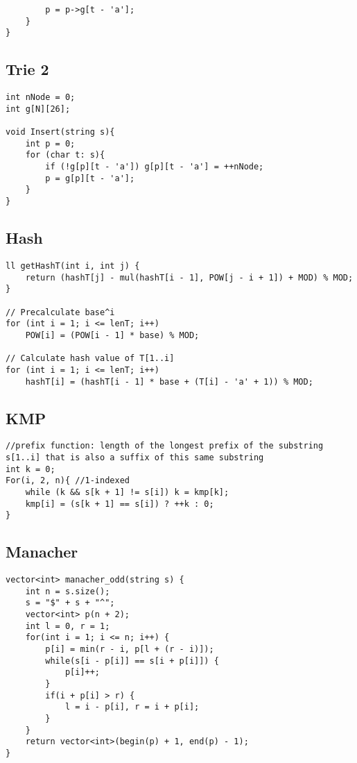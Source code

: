 \documentclass[11pt,a4paper]{article}
\begin{document}
\begin{multicols*}{2}
\begin{lstlisting}
		p = p->g[t - 'a'];	
	}
}
\end{lstlisting}

\subsection{Trie 2}
\begin{lstlisting}
int nNode = 0;
int g[N][26];

void Insert(string s){
    int p = 0;
    for (char t: s){
        if (!g[p][t - 'a']) g[p][t - 'a'] = ++nNode;
        p = g[p][t - 'a'];
    }
}
\end{lstlisting}

\subsection{Hash}
\begin{lstlisting}
ll getHashT(int i, int j) {
    return (hashT[j] - mul(hashT[i - 1], POW[j - i + 1]) + MOD) % MOD;
}

// Precalculate base^i
for (int i = 1; i <= lenT; i++)
    POW[i] = (POW[i - 1] * base) % MOD;

// Calculate hash value of T[1..i]
for (int i = 1; i <= lenT; i++)
    hashT[i] = (hashT[i - 1] * base + (T[i] - 'a' + 1)) % MOD;
\end{lstlisting}

\subsection{KMP}
\begin{lstlisting}
//prefix function: length of the longest prefix of the substring s[1..i] that is also a suffix of this same substring
int k = 0;
For(i, 2, n){ //1-indexed
    while (k && s[k + 1] != s[i]) k = kmp[k];
    kmp[i] = (s[k + 1] == s[i]) ? ++k : 0;
}
\end{lstlisting}

\subsection{Manacher}
\begin{lstlisting}
vector<int> manacher_odd(string s) {
    int n = s.size();
    s = "$" + s + "^";
    vector<int> p(n + 2);
    int l = 0, r = 1;
    for(int i = 1; i <= n; i++) {
        p[i] = min(r - i, p[l + (r - i)]);
        while(s[i - p[i]] == s[i + p[i]]) {
            p[i]++;
        }
        if(i + p[i] > r) {
            l = i - p[i], r = i + p[i];
        }
    }
    return vector<int>(begin(p) + 1, end(p) - 1);
}


\end{lstlisting}
\end{multicols*}
\end{document}
